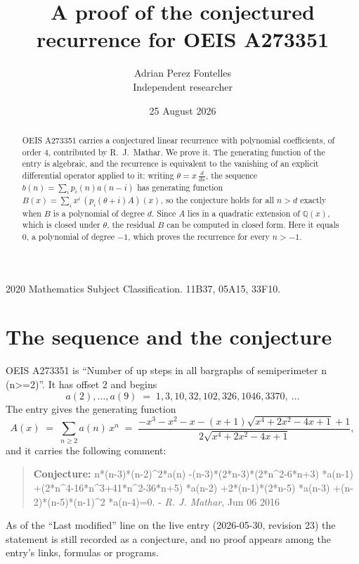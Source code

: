 \documentclass[11pt,a4paper]{article}
\title{A proof of the conjectured recurrence for OEIS A273351}
\author{Adrian Perez Fontelles\\ \small Independent researcher}
\date{25 August 2026}
\theoremstyle{plain}
\theoremstyle{definition}
\begin{document}
\maketitle

\begin{abstract}
OEIS A273351 carries a conjectured linear recurrence with polynomial coefficients, of
order 4, contributed by R.~J.~Mathar. We prove it. The generating function of the
entry is algebraic, and the recurrence is equivalent to the vanishing of an explicit
differential operator applied to it: writing $\theta=x\,\frac{d}{dx}$, the sequence
$b(n)=\sum_{i}p_{i}(n)a(n-i)$ has generating function
$B(x)=\sum_{i}x^{i}\,(p_{i}(\theta+i)A)(x)$, so the conjecture holds for all $n>d$ exactly
when $B$ is a polynomial of degree $d$. Since $A$ lies in a quadratic extension of
$\mathbb{Q}(x)$, which is closed under $\theta$, the residual $B$ can be computed in
closed form. Here it equals $0$, a polynomial of degree $-1$, which proves
the recurrence for every $n>-1$.
\end{abstract}

\noindent\small 2020 Mathematics Subject Classification. 11B37, 05A15, 33F10.\normalsize

\section{The sequence and the conjecture}

OEIS A273351 is ``Number of up steps in all bargraphs of semiperimeter n (n>=2)''. It has offset $2$ and begins
\[
a(2),\dots,a(9)\;=\;1, 3, 10, 32, 102, 326, 1046, 3370,\ \dots
\]
The entry gives the generating function
\begin{equation}\label{eq:gf}
A(x)\;=\;\sum_{n\ge 2} a(n)\,x^{n}\;=\;\frac{- x^{3} - x^{2} - x - \left(x + 1\right) \sqrt{x^{4} + 2 x^{2} - 4 x + 1} + 1}{2 \sqrt{x^{4} + 2 x^{2} - 4 x + 1}} ,
\end{equation}
and it carries the following comment:
\begin{quote}\small
\textbf{Conjecture:} n*(n-3)*(n-2)\^{}2*a(n) -(n-3)*(2*n-3)*(2*n\^{}2-6*n+3) *a(n-1) +(2*n\^{}4-16*n\^{}3+41*n\^{}2-36*n+5) *a(n-2) +2*(n-1)*(2*n-5) *a(n-3) +(n-2)*(n-5)*(n-1)\^{}2 *a(n-4)=0. - \emph{R. J. Mathar}, Jun 06 2016
\end{quote}
As of the ``Last modified'' line on the live entry (2026-05-30, revision 23) the
statement is still recorded as a conjecture, and no proof appears among the entry's links,
formulas or programs.
\end{document}
